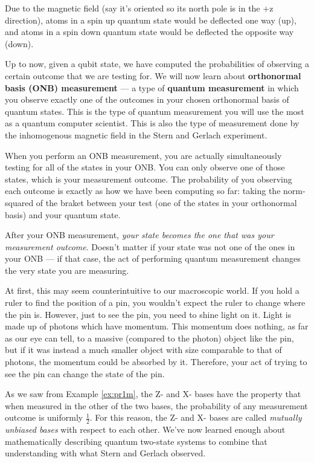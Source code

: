 \documentclass{article}
\begin{document}
Due to the magnetic field (say it's oriented so its north pole is in the $+$z direction), atoms in a spin up quantum state would be deflected one way (up), and atoms in a spin down quantum state would be deflected the opposite way (down).

Up to now, given a qubit state, we have computed the probabilities of observing a certain outcome that we are testing for.  We will now learn about \textbf{orthonormal basis (ONB) measurement} --- a type of \textbf{quantum measurement} in which you observe exactly one of the outcomes in your chosen orthonormal basis of quantum states.  This is the type of quantum measurement you will use the most as a quantum computer scientist.  This is also the type of measurement done by the inhomogenous magnetic field in the Stern and Gerlach experiment.

When you perform an ONB measurement, you are actually simultaneously testing for all of the states in your ONB.  You can only observe one of those states, which is your measurement outcome.  The probability of you observing each outcome is exactly as how we have been computing so far: taking the norm-squared of the braket between your test (one of the states in your orthonormal basis) and your quantum state.

After your ONB measurement, \textit{your state becomes the one that was your measurement outcome}.  Doesn't matter if your state was not one of the ones in your ONB --- if that case, the act of performing quantum measurement changes the very state you are measuring.

At first, this may seem counterintuitive to our macroscopic world.  If you hold a ruler to find the position of a pin, you wouldn't expect the ruler to change where the pin is.  However, just to see the pin, you need to shine light on it.  Light is made up of photons which have momentum.  This momentum does nothing, as far as our eye can tell, to a massive (compared to the photon) object like the pin, but if it was instead a much smaller object with size comparable to that of photons, the momentum could be absorbed by it.  Therefore, your act of trying to see the pin can change the state of the pin.

As we saw from Example \ref{ex:pr1m}, the Z- and X- bases have the property that when measured in the other of the two bases, the probability of any measurement outcome is uniformly $\frac{1}{2}$.  For this reason, the Z- and X- bases are called \textit{mutually unbiased bases} with respect to each other.  We've now learned enough about mathematically describing quantum two-state systems to combine that understanding with what Stern and Gerlach observed.
\end{document}
